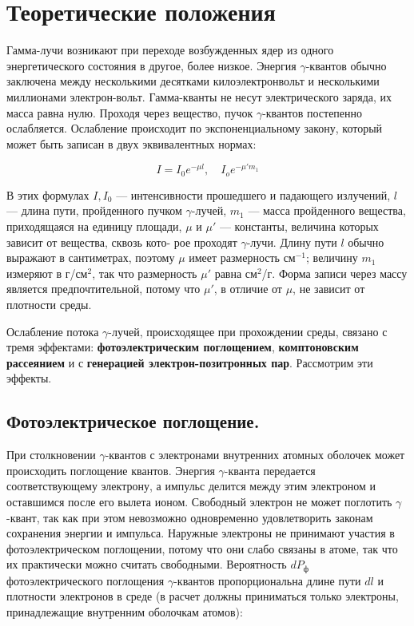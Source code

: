 \section{Теоретические положения}


		Гамма-лучи возникают при переходе возбужденных ядер из одного энергетического состояния в другое, более низкое. Энергия $ \gamma $-квантов обычно заключена между несколькими десятками килоэлектронвольт и несколькими миллионами электрон-вольт. Гамма-кванты не несут электрического заряда, их масса равна нулю. Проходя через вещество, пучок $ \gamma $-квантов постепенно ослабляется. Ослабление происходит по экспоненциальному закону, который может быть записан в двух эквивалентных нормах:
		
		\begin{equation}\label{I(mu)}
		I = I_0 e^{-\mu l}, \quad I_o e^{-\mu 'm_1} 
		\end{equation}
		
		В этих формулах $ I, I_0 $ --- интенсивности прошедшего и падающего излучений, $ l $ --- длина пути, пройденного пучком $\gamma$-лучей, $ m_1 $ ---
		масса пройденного вещества, приходящаяся на единицу площади, $ \mu $ и
		$ \mu' $ --- константы, величина которых зависит от вещества, сквозь кото-
		рое проходят $\gamma$-лучи. Длину пути $ l $ обычно выражают в сантиметрах,
		поэтому $ \mu $ имеет размерность см$ ^{-1} $; величину $ m_1 $ измеряют в г/см$ ^2 $,
		так что размерность $ \mu' $ равна см$ ^2 $/г. Форма записи через массу является предпочтительной, потому что $ \mu' $, в отличие от $ \mu $, не зависит от плотности среды. 
		
		Ослабление потока $\gamma$-лучей, происходящее при прохождении среды, связано с тремя эффектами: \textbf{фотоэлектрическим поглощением},
		\textbf{комптоновским рассеянием} и с \textbf{генерацией электрон-позитронных пар}. Рассмотрим эти эффекты.
		
		\subsection{Фотоэлектрическое поглощение.} 
		При столкновении $\gamma$-квантов с
	    электронами внутренних атомных оболочек может происходить поглощение квантов. Энергия $\gamma$-кванта передается соответствующему электрону, а импульс делится между этим электроном и оставшимся после
		его вылета ионом. Свободный электрон не может поглотить $\gamma$-квант,
		так как при этом невозможно одновременно удовлетворить законам
		сохранения энергии и импульса. Наружные электроны не принимают участия в фотоэлектрическом поглощении, потому что они слабо
		связаны в атоме, так что их практически можно считать свободными.
		Вероятность $ dP_ф $ фотоэлектрического поглощения $\gamma$-квантов пропорциональна длине пути $ dl $ и плотности электронов в среде (в расчет
		должны приниматься только электроны, принадлежащие внутренним
		оболочкам атомов):
		
